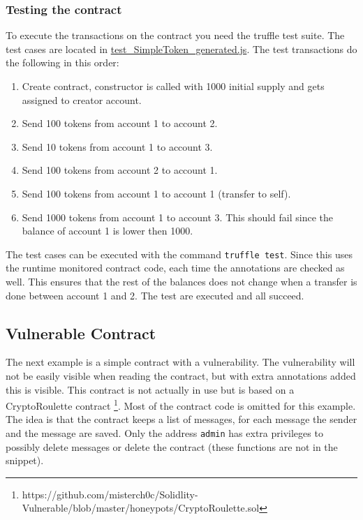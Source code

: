 \documentclass[a4paper]{article}
\begin{document}
\subsubsection{Testing the contract}
To execute the transactions on the contract you need the truffle test suite. The test cases are located in \href{https://github.com/LarsStegeman/EthereumRuntimeMonitoring/blob/master/src/test/test_SimpleToken_generated.js}{test\_SimpleToken\_generated.js}.
The test transactions do the following in this order:
\begin{enumerate}
  \item Create contract, constructor is called with 1000 initial supply and gets assigned to creator account.
  \item Send 100 tokens from account 1 to account 2.
  \item Send 10 tokens from account 1 to account 3.
  \item Send 100 tokens from account 2 to account 1.
  \item Send 100 tokens from account 1 to account 1 (transfer to self).
  \item Send 1000 tokens from account 1 to account 3. This should fail since the balance of account 1 is lower then 1000.
\end{enumerate}
The test cases can be executed with the command \texttt{truffle test}. Since this uses the runtime monitored contract code, each time the annotations are checked as well. This ensures that the rest of the balances does not change when a transfer is done between account 1 and 2. The test are executed and all succeed.

\subsection{Vulnerable Contract}
The next example is a simple contract with a vulnerability. The vulnerability will not be easily visible when reading the contract, but with extra annotations added this is visible. This contract is not actually in use but is based on a CryptoRoulette contract \footnote{https://github.com/misterch0c/Solidlity-Vulnerable/blob/master/honeypots/CryptoRoulette.sol}. Most of the contract code is omitted for this example. The idea is that the contract keeps a list of messages, for each message the sender and the message are saved. Only the address \texttt{admin} has extra privileges to possibly delete messages or delete the contract (these functions are not in the snippet). 

\end{document}
